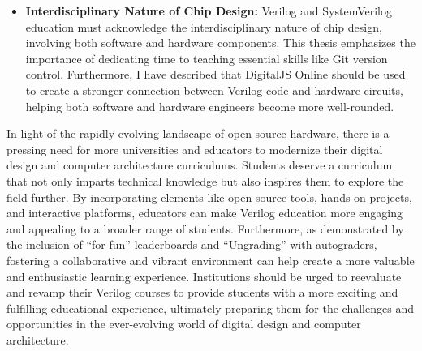 \begin{itemize}
    \item \textbf{Interdisciplinary Nature of Chip Design:} Verilog and SystemVerilog education must acknowledge the interdisciplinary nature of chip design, involving both software and hardware components. This thesis emphasizes the importance of dedicating time to teaching essential skills like Git version control. Furthermore, I have described that DigitalJS Online should be used to create a stronger connection between Verilog code and hardware circuits, helping both software and hardware engineers become more well-rounded.
\end{itemize}

In light of the rapidly evolving landscape of open-source hardware, there is a pressing need for more universities and educators to modernize their digital design and computer architecture curriculums. Students deserve a curriculum that not only imparts technical knowledge but also inspires them to explore the field further. By incorporating elements like open-source tools, hands-on projects, and interactive platforms, educators can make Verilog education more engaging and appealing to a broader range of students. Furthermore, as demonstrated by the inclusion of ``for-fun'' leaderboards and ``Ungrading'' with autograders, fostering a collaborative and vibrant environment can help create a more valuable and enthusiastic learning experience. Institutions should be urged to reevaluate and revamp their Verilog courses to provide students with a more exciting and fulfilling educational experience, ultimately preparing them for the challenges and opportunities in the ever-evolving world of digital design and computer architecture.
